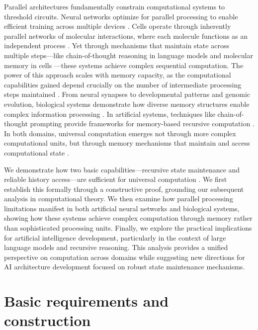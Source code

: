 \documentclass[12pt]{article}
\begin{document}
Parallel architectures fundamentally constrain computational systems to threshold circuits.
Neural networks optimize for parallel processing to enable efficient training across multiple devices \cite{merrill2023parallelism,merrill2024}.
Cells operate through inherently parallel networks of molecular interactions, where each molecule functions as an independent process \cite{fu2023scgrn}.
Yet through mechanisms that maintain state across multiple steps---like chain-of-thought reasoning in language models \cite{wei2022chain,qiu2024ask} and molecular memory in cells \cite{hoel2020emergence}---these systems achieve complex sequential computation.
The power of this approach scales with memory capacity, as the computational capabilities gained depend crucially on the number of intermediate processing steps maintained \cite{merrill2024}.
From neural synapses to developmental patterns and genomic evolution, biological systems demonstrate how diverse memory structures enable complex information processing \cite{burrill2010making,espinosa2024molecular}.
In artificial systems, techniques like chain-of-thought prompting provide frameworks for memory-based recursive computation \cite{wei2022chain,dickson2024trust,ahn2024recursive}.
In both domains, universal computation emerges not through more complex computational units, but through memory mechanisms that maintain and access computational state \cite{schuurmans2024autoregressive}.

We demonstrate how two basic capabilities---recursive state maintenance and reliable history access---are sufficient for universal computation \cite{bennett1989time,boyle2024memory}.
We first establish this formally through a constructive proof, grounding our subsequent analysis in computational theory.
We then examine how parallel processing limitations manifest in both artificial neural networks and biological systems, showing how these systems achieve complex computation through memory rather than sophisticated processing units.
Finally, we explore the practical implications for artificial intelligence development, particularly in the context of large language models and recursive reasoning.
This analysis provides a unified perspective on computation across domains while suggesting new directions for AI architecture development focused on robust state maintenance mechanisms.

\section{Basic requirements and construction}
\end{document}
